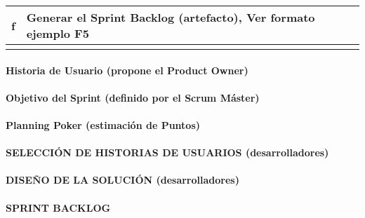 \begin{doublespace}
\begin{longtable}{|c|p{15cm}|}
\hline
\rowcolor{lightblue} f & Generar el Sprint Backlog (artefacto), Ver formato ejemplo F5 \\
\hline
\rowcolor{bleudefrance} \multicolumn{2}{c|}{} \\
\hline

\end{longtable}

\clearpage  %

\paragraph{\Large\textbf {Historia de Usuario (propone el Product Owner)}}


\clearpage  %
\paragraph{\Large\textbf {Objetivo del Sprint (definido por el Scrum Máster)}}


\paragraph{\Large\textbf {Planning Poker (estimación de Puntos)}}


\clearpage  %
\paragraph{\large\textbf {SELECCIÓN DE HISTORIAS DE USUARIOS (desarrolladores)}}


\clearpage  %
\paragraph{\Large\textbf {DISEÑO DE LA SOLUCIÓN (desarrolladores)}}


\clearpage %
\paragraph{\Large\textbf {SPRINT BACKLOG}}




\end{doublespace}
